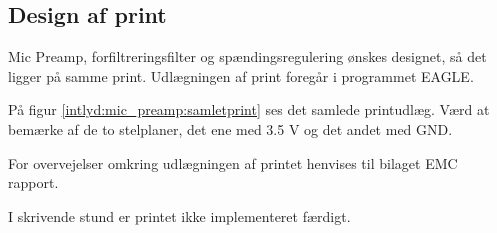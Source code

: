 \subsection*{Design af print}
Mic Preamp, forfiltreringsfilter og spændingsregulering ønskes designet, så det ligger på samme print. Udlægningen af print foregår i programmet EAGLE. 

På figur \ref{intlyd:mic_preamp:samletprint} ses det samlede printudlæg. Værd at bemærke af de to stelplaner, det ene med 3.5 V og det andet med GND. 


For overvejelser omkring udlægningen af printet henvises til bilaget EMC rapport. 

I skrivende stund er printet ikke implementeret færdigt. 




